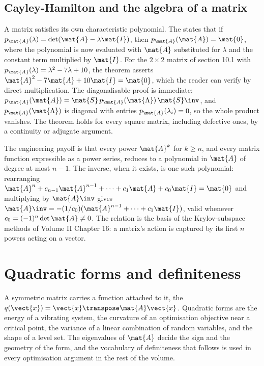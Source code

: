 \subsection{Cayley-Hamilton and the algebra of a matrix}

A matrix satisfies its own characteristic polynomial. The
 states that if $p_{\mat{A}}
(\lambda) = \det(\mat{A} - \lambda \mat{I})$, then $p_{\mat{A}}
(\mat{A}) = \mat{0}$, where the polynomial is now evaluated with
$\mat{A}$ substituted for $\lambda$ and the constant term multiplied
by $\mat{I}$. For the $2 \times 2$ matrix of section 10.1 with
$p_{\mat{A}}(\lambda) = \lambda^{2} - 7\lambda + 10$, the theorem
asserts $\mat{A}^{2} - 7\mat{A} + 10\mat{I} = \mat{0}$, which the
reader can verify by direct multiplication. The diagonalisable
proof is immediate: $p_{\mat{A}}(\mat{A}) = \mat{S}\, p_{\mat{A}}
(\mat{\Lambda})\, \mat{S}\inv$, and $p_{\mat{A}}(\mat{\Lambda})$ is
diagonal with entries $p_{\mat{A}}(\lambda_{i}) = 0$, so the whole
product vanishes. The theorem holds for every square matrix,
including defective ones, by a continuity or adjugate argument.

The engineering payoff is that every power $\mat{A}^{k}$ for $k \geq
n$, and every matrix function expressible as a power series, reduces
to a polynomial in $\mat{A}$ of degree at most $n - 1$. The inverse,
when it exists, is one such polynomial: rearranging $\mat{A}^{n} +
c_{n-1}\mat{A}^{n-1} + \cdots + c_{1}\mat{A} + c_{0}\mat{I} =
\mat{0}$ and multiplying by $\mat{A}\inv$ gives $\mat{A}\inv =
-(1/c_{0})(\mat{A}^{n-1} + \cdots + c_{1}\mat{I})$, valid whenever
$c_{0} = (-1)^{n}\det\mat{A} \neq 0$. The relation is the basis of
the Krylov-subspace methods of Volume II Chapter 16: a matrix's
action is captured by its first $n$ powers acting on a vector.

\section{Quadratic forms and definiteness}

A symmetric matrix carries a function attached to it, the
 $q(\vect{x}) = \vect{x}\transpose \mat{A}
\vect{x}$. Quadratic forms are the energy of a vibrating system,
the curvature of an optimisation objective near a critical point,
the variance of a linear combination of random variables, and the
shape of a level set. The eigenvalues of $\mat{A}$ decide the sign
and the geometry of the form, and the vocabulary of definiteness
that follows is used in every optimisation argument in the rest of
the volume.

